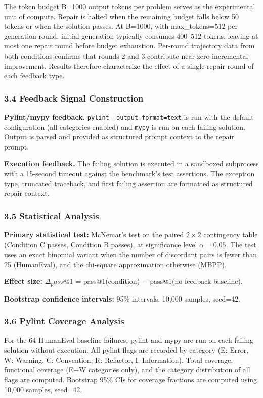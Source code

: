 The token budget B=1000 output tokens per problem serves as the experimental unit of compute. Repair is halted when the remaining budget falls below 50 tokens or when the solution passes. At B=1000, with max\_tokens=512 per generation round, initial generation typically consumes 400--512 tokens, leaving at most one repair round before budget exhaustion. Per-round trajectory data from both conditions confirms that rounds 2 and 3 contribute near-zero incremental improvement. Results therefore characterize the effect of a single repair round of each feedback type.

\subsubsection{3.4 Feedback Signal Construction}

\textbf{Pylint/mypy feedback.} \texttt{pylint --output-format=text} is run with the default configuration (all categories enabled) and \texttt{mypy} is run on each failing solution. Output is parsed and provided as structured prompt context to the repair prompt.

\textbf{Execution feedback.} The failing solution is executed in a sandboxed subprocess with a 15-second timeout against the benchmark's test assertions. The exception type, truncated traceback, and first failing assertion are formatted as structured repair context.

\subsubsection{3.5 Statistical Analysis}

\textbf{Primary statistical test:} McNemar's test on the paired $2\times 2$ contingency table (Condition C passes, Condition B passes), at significance level $\alpha =0.05$. The test uses an exact binomial variant when the number of discordant pairs is fewer than 25 (HumanEval), and the chi-square approximation otherwise (MBPP).

\textbf{Effect size:} $\Delta _pass$@1 = pass@1(condition) $-$ pass@1(no-feedback baseline).

\textbf{Bootstrap confidence intervals:} 95\% intervals, 10,000 samples, seed=42.

\subsubsection{3.6 Pylint Coverage Analysis}

For the 64 HumanEval baseline failures, pylint and mypy are run on each failing solution without execution. All pylint flags are recorded by category (E: Error, W: Warning, C: Convention, R: Refactor, I: Information). Total coverage, functional coverage (E+W categories only), and the category distribution of all flags are computed. Bootstrap 95\% CIs for coverage fractions are computed using 10,000 samples, seed=42.

